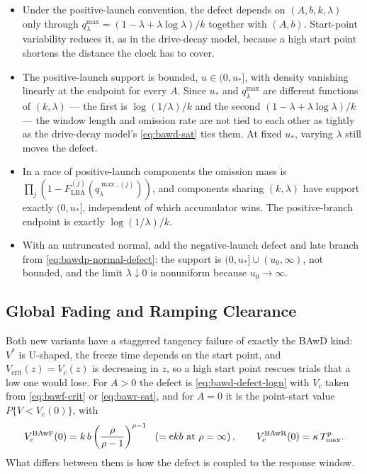 \documentclass[12pt]{article}
\newcommand{\e}{\mathrm{e}}
\theoremstyle{remark}
\begin{document}
\begin{itemize}
  \item Under the positive-launch convention, the defect depends on $(A,b,k,\lambda)$ only through $q_{\lambda}^{\max}=(1-\lambda+\lambda\log\lambda)/k$ together with $(A,b)$. Start-point variability reduces it, as in the drive-decay model, because a high start point shortens the distance the clock has to cover.
  \item The positive-launch support is bounded, $u\in(0,u_{*}]$, with density vanishing linearly at the endpoint for every $A$. Since $u_{*}$ and $q_{\lambda}^{\max}$ are different functions of $(k,\lambda)$ --- the first is $\log(1/\lambda)/k$ and the second $(1-\lambda+\lambda\log\lambda)/k$ --- the window length and omission rate are not tied to each other as tightly as the drive-decay model's
        \eqref{eq:bawd-sat} ties them. At fixed $u_{*}$, varying $\lambda$
        still moves the defect.
  \item In a race of positive-launch components the omission mass is $\prod_j(1-F_{\mathrm{LBA}}^{(j)} (q_{\lambda}^{\max,(j)}))$, and components sharing $(k,\lambda)$ have support exactly $(0,u_{*}]$, independent of which accumulator wins. The positive-branch endpoint is exactly $\log(1/\lambda)/k$.
  \item With an untruncated normal, add the negative-launch defect and late branch from \eqref{eq:bawdp-normal-defect}: the support is $(0,u_{*}]\cup(u_0,\infty)$, not bounded, and the limit $\lambda\downarrow0$ is nonuniform because $u_0\to\infty$.
\end{itemize}

\subsection{Global Fading and Ramping Clearance}
Both new variants have a staggered tangency failure of exactly the BAwD kind: $V^{*}$ is U-shaped, the freeze time depends on the start point, and $V_{\mathrm{crit}}(z)=V_c(z)$ is decreasing in $z$, so a high start point rescues trials that a low one would lose. For $A>0$ the defect is
\eqref{eq:bawd-defect-logn} with $V_c$ taken from \eqref{eq:bawf-crit} or
\eqref{eq:bawr-sat}, and for $A=0$ it is the point-start value
$P\{V<V_c(0)\}$, with
\begin{equation}
  V_c^{\rm BAwF}(0) = k\,b\left(\frac{\rho}{\rho-1}\right)^{\rho-1}
  \ \ \left(=\e kb\ \text{at}\ \rho=\infty\right),
  \qquad
  V_c^{\rm BAwR}(0) = \kappa\,T_{\max}^{p}.
  \label{eq:new-defects}
\end{equation}
What differs between them is how the defect is coupled to the response window.
\end{document}
